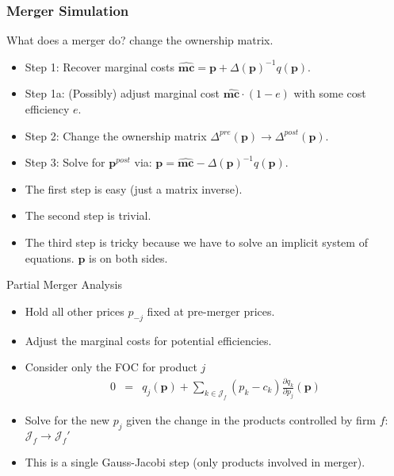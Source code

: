 \documentclass[xcolor=pdftex,dvipsnames,table,mathserif,aspectratio=169]{beamer}
\begin{document}
\begin{frame}
\frametitle{Merger Simulation}
What does a merger do? \alert{change the ownership matrix}.
\begin{itemize}

\item Step 1: Recover marginal costs $\widehat{\mathbf{mc}} = \mathbf{p} +\Delta(\mathbf{p})^{-1}q(\mathbf{p})$.
\item Step 1a: (Possibly) adjust marginal cost $\widehat{\mathbf{mc}}\cdot (1-e)$ with some cost efficiency $e$.
\item Step 2: Change the ownership matrix $\Delta^{pre}(\mathbf{p}) \rightarrow \Delta^{post}(\mathbf{p})$.
\item Step 3: Solve for $\mathbf{p}^{post}$ via: $\mathbf{p} = \widehat{\mathbf{mc}} - \Delta(\mathbf{p})^{-1}q(\mathbf{p})$.
\end{itemize}
\pause
\vspace{0.5cm}
\begin{itemize}
\item The first step is easy (just a matrix inverse).
\item The second step is trivial.
\item The third step is tricky because we have to solve an implicit system of equations. $\mathbf{p}$ is on both sides.
\end{itemize}
\end{frame}


\begin{frame}{Partial Merger Analysis}
\begin{itemize}
\item Hold all other prices $p_{-j}$ fixed at \alert{pre-merger} prices.
\item Adjust the marginal costs for potential efficiencies.
\item Consider only the FOC for product $j$
\begin{eqnarray*}
0&=& q_j(\mathbf{p}) + \sum_{k \in \mathcal{J}_f} (p_k - c_k) \frac{\partial q_{k}}{\partial p_j}(\mathbf{p})
\end{eqnarray*}
\item Solve for the new $p_j$ given the change in the products controlled by firm $f$: $\mathcal{J}_f \rightarrow \mathcal{J}_f'$
\item This is a single Gauss-Jacobi step (only products involved in merger).
\end{itemize}
\end{frame} 
\end{document}
